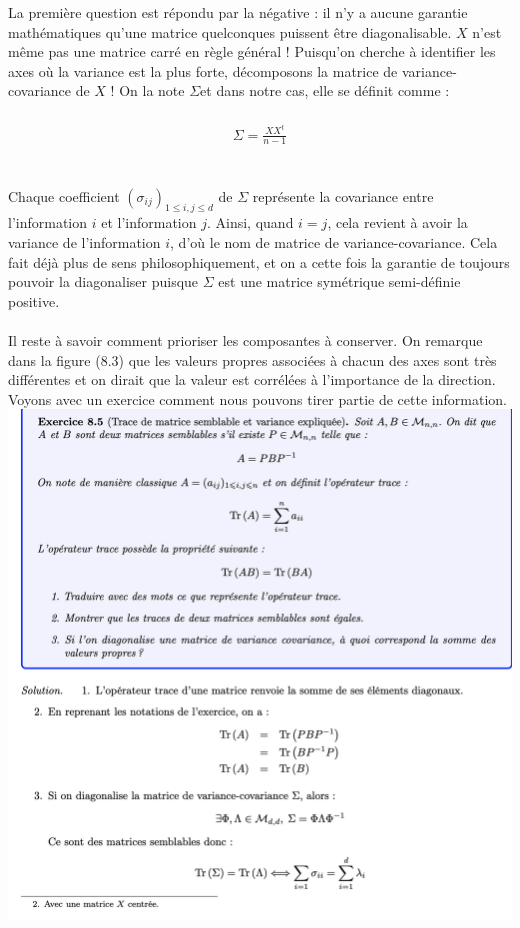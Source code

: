                     La première question est répondu par la négative : il n’y a aucune garantie mathématiques qu’une matrice quelconques puissent être diagonalisable. $X$ n’est même pas une matrice carré en règle général ! Puisqu’on cherche à identifier les axes où la variance est la plus forte, décomposons la matrice de variance-covariance de $X$ ! On la note $\Sigma $et dans notre cas, elle se définit comme :
                    \\
                    \\
                    \begin{eqnarray*}
                        \Sigma = \frac{XX^t}{n - 1}
                    \end{eqnarray*}
                    \\
                    \\
                    Chaque coefficient $(\sigma_{ij})_{1 \leqslant i, j \leqslant d}$ de $\Sigma$ représente la covariance entre l’information $i$ et l’information $j$. Ainsi, quand $i = j$, cela revient à avoir la variance de l’information $i$, d’où le nom de matrice de variance-covariance. Cela fait déjà plus de sens philosophiquement, et on a cette fois la garantie de toujours pouvoir la diagonaliser puisque $\Sigma$ est une matrice symétrique semi-définie positive.
                    \\
                    \\
                    Il reste à savoir comment prioriser les composantes à conserver. On remarque dans la figure (8.3) que les valeurs propres associées à chacun des axes sont très différentes et on dirait que la valeur est corrélées à l’importance de la direction.
                    Voyons avec un exercice comment nous pouvons tirer partie de cette information.
                    \\
                    \includegraphics[width=\linewidth]{./img/reduction_dim/pca/mat_trace}

